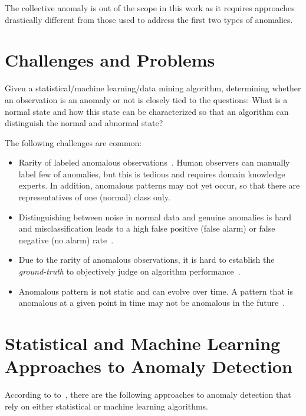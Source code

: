 The collective anomaly is out of the scope in this work as it requires approaches drastically different from those used to address the first two types of anomalies.

\section{Challenges and Problems}\label{challenges}
Given a statistical/machine learning/data mining algorithm, determining whether an observation is an anomaly or not is closely tied to the questions: What is a normal state and how this state can be characterized so that an algorithm can distinguish the normal and abnormal state? 

The following challenges are common:
\begin{itemize}
    \item Rarity of labeled anomalous observations~\cite{Weiss:2004:MRU:1007730.1007734}. Human observers can manually label few of anomalies, but this is tedious and requires domain knowledge experts. In addition, anomalous patterns may not yet occur, so that there are representatives of one (normal) class only.
    
    \item Distinguishing between noise in normal data and genuine anomalies is hard and misclassification leads to a high false positive (false alarm)  or false negative  (no alarm) rate~\cite{Chandola:2009:ADS:1541880.1541882}.   %

    \item Due to the rarity of anomalous observations, it is hard to establish the \textit{ground-truth} to objectively judge on algorithm performance~\cite{Aggarwal:2013}. %
    
    \item Anomalous pattern is not static and can evolve over time. A pattern that is anomalous at a given point in time may not be anomalous in the future~\cite{Chandola:2009:ADS:1541880.1541882}.
\end{itemize}

\section{Statistical and Machine Learning Approaches to Anomaly Detection}\label{approaches2problem}
According to to~\cite{Aggarwal:2013}, there are the following approaches to anomaly detection that rely on either statistical or machine learning algorithms.

